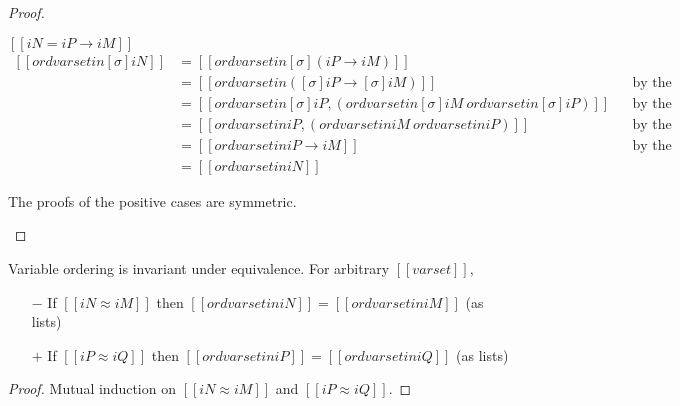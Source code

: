 \begin{proof}
\begin{caseof}
    \item $[[iN = iP → iM]]$\\
       $ \begin{aligned}
        [[ ord varset in [σ]iN ]] &= [[ ord varset in [σ](iP → iM) ]] \\
                                   &= [[ ord varset in ([σ]iP → [σ]iM) ]]
                                   && \text{by the definition of substitution}\\
                                   &= [[ ord varset in [σ]iP, (ord varset in [σ]iM \ {ord varset in [σ]iP}) ]]
                                   && \text{by the definition of ordering}\\
                                   &= [[ ord varset in iP, (ord varset in iM \ {ord varset in iP}) ]]
                                   && \text{by the induction hypothesis}\\
                                   &= [[ ord varset in iP → iM ]]
                                   && \text{by the definition of ordering}\\
                                   &= [[ ord varset in iN ]]
       \end{aligned} $
    \item The proofs of the positive cases are symmetric.
  \end{caseof}
\end{proof}

\begin{lemma}
  \label{lemma:ord-completeness}
  Variable ordering is invariant under equivalence. For arbitrary $[[varset]]$,
   \begin{itemize}
  \item[$-$] If $[[iN ≈ iM]]$ then $[[ord varset in iN]] = [[ord varset in iM]]$ (as lists)
  \item[$+$] If $[[iP ≈ iQ]]$ then $[[ord varset in iP]] = [[ord varset in iQ]]$ (as lists)
  \end{itemize}
\end{lemma}
\begin{proof}
  Mutual induction on $[[iN ≈ iM]]$ and $[[iP ≈ iQ]]$.
\end{proof}
